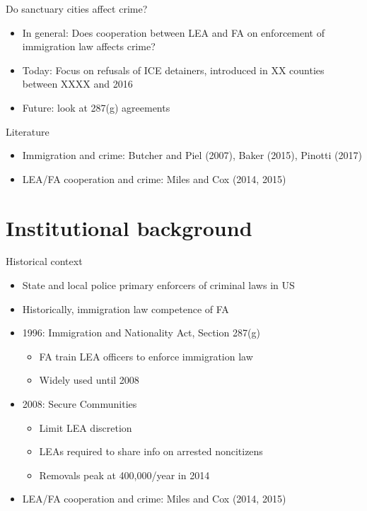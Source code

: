 \documentclass[xcolor=pdftex,dvipsnames,table]{beamer}
\begin{document}
\begin{frame}{ Do sanctuary cities affect crime?}
\begin{itemize}
\item In general: Does cooperation between LEA and FA on enforcement of immigration law affects crime?
\item Today: Focus on refusals of ICE detainers, introduced in XX counties between XXXX and 2016
\item Future: look at 287(g) agreements
\end{itemize}
\end{frame}

\begin{frame}{Literature}
\begin{itemize}
\item Immigration and crime: Butcher and Piel (2007), Baker (2015), Pinotti (2017)
\item LEA/FA cooperation and crime: Miles and Cox (2014, 2015)
\end{itemize}
\end{frame}

\section{Institutional background}

\begin{frame}{Historical context}
\begin{itemize}
\item State and local police primary enforcers of criminal laws in US
\item Historically, immigration law competence of FA
\item 1996: Immigration and Nationality Act, Section 287(g)
\begin{itemize}
\item FA train LEA officers to enforce immigration law
\item Widely used until 2008
\end{itemize}
\item 2008: Secure Communities
\begin{itemize}
\item Limit LEA discretion
\item LEAs required to share info on arrested noncitizens
\item Removals peak at 400,000/year in 2014
\end{itemize}

\item LEA/FA cooperation and crime: Miles and Cox (2014, 2015)
\end{itemize}
\end{frame}
\end{document}
